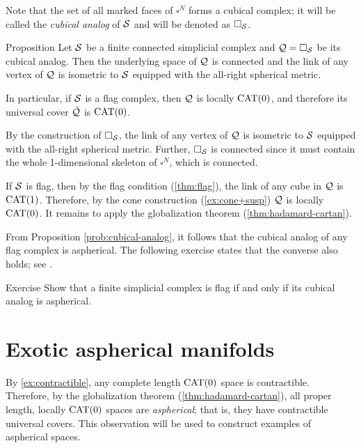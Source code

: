 Note that the set of all marked faces of $\square^{N}$
forms a cubical complex;
it will be called 
the \emph{cubical analog} of $\mathcal{S}$
and will be denoted as $\square_{\mathcal{S}}$.

\begin{thm}{Proposition}\label{prob:cubical-analog}
Let $\mathcal{S}$ be a finite connected simplicial complex
and $\mathcal{Q}=\square_{\mathcal{S}}$ be its cubical analog.
Then the underlying space of $\mathcal{Q}$ is connected 
and the link of any vertex of $\mathcal{Q}$
is isometric to ${\mathcal{S}}$
equipped with the all-right spherical metric.

In particular, if $\mathcal{S}$ is a flag complex,
then $\mathcal{Q}$ is locally $\mathrm{CAT}(0)$,
and therefore its universal cover $\tilde{\mathcal{Q}}$ is $\mathrm{CAT}(0)$.
\end{thm}

By the construction of $\square_{\mathcal{S}}$, the link of any vertex of $\mathcal{Q}$ is isometric to ${\mathcal{S}}$
equipped with the all-right spherical metric.
Further, $\square_{\mathcal{S}}$ is connected since it must contain the whole 1-dimensional skeleton of $\square^{N}$, which is connected.

If ${\mathcal{S}}$ is flag, then by the flag condition (\ref{thm:flag}), the link of any cube in $\mathcal{Q}$ is $\mathrm{CAT}(1)$.
Therefore, by the cone construction (\ref{ex:cone+susp}) $\mathcal{Q}$ is locally $\mathrm{CAT}(0)$.
It remains to apply the globalization theorem (\ref{thm:hadamard-cartan}).
\qeds

From Proposition \ref{prob:cubical-analog}, 
it follows that the cubical analog
of any flag complex is aspherical.
The following exercise states that the converse also holds; see \cite[5.4]{davis-2001}.

\begin{thm}{Exercise}\label{ex:flag-aspherical}
Show that a finite simplicial complex is flag 
if and only if its cubical analog is aspherical.
\end{thm}

\section{Exotic aspherical manifolds}

By \ref{ex:contractible}, any complete length $\mathrm{CAT}(0)$ space is contractible.
Therefore, by the globalization theorem (\ref{thm:hadamard-cartan}), all proper length, locally $\mathrm{CAT}(0)$ spaces 
are \emph{aspherical};
that is, they have contractible universal covers.
This observation will be used to construct examples of aspherical spaces. 

